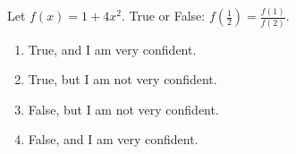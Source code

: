 \bigskip

\item Let $f(x)=1+4x^2$.  True or False:  $f(\frac{1}{2})=\frac{f(1)}{f(2)}$.

    \begin{enumerate}
    \item True, and I am very confident.
    \item True, but I am not very confident.
    \item False, but I am not very confident.
    \item False, and I am very confident.
    \end{enumerate}
    
